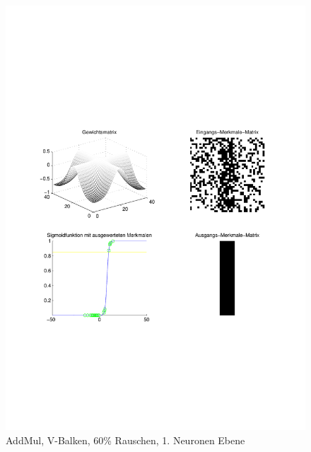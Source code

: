 \begin{figure}[hbt]
	\begin{minipage}{0.8 \textwidth}
		\includegraphics[width=\textwidth]{./Bilder/Auswertung/Endergebnis/TypeAddMul_Rauschen60_V_Line_Layer1}
		\caption{AddMul, V-Balken, 60\% Rauschen, 1. Neuronen Ebene}
		\label{AddMul_V_60_1}
	\end{minipage}
	\vfill
	\begin{minipage}{0.8 \textwidth}

\end{minipage}
\end{figure}
